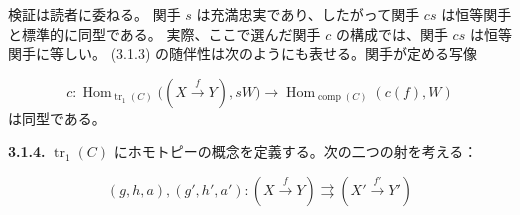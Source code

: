 検証は読者に委ねる。
関手 $s$ は充満忠実であり、したがって関手 $cs$ は恒等関手と標準的に同型である。
実際、ここで選んだ関手 $c$ の構成では、関手 $cs$ は恒等関手に等しい。
(3.1.3) の随伴性は次のようにも表せる。関手が定める写像

\begin{equation*}
  c\colon
  \operatorname{Hom}_{\operatorname{tr}_1(C)}
    \bigl((X\xrightarrow{f}Y),sW\bigr)
  \longrightarrow
  \operatorname{Hom}_{\operatorname{comp}(C)}(c(f),W)
\end{equation*}
は同型である。

\noindent\textbf{3.1.4.}\quad
$\operatorname{tr}_1(C)$ にホモトピーの概念を定義する。次の二つの射を考える：

\begin{equation*}
  (g,h,a),(g',h',a')\colon
  (X\xrightarrow{f}Y)
  \rightrightarrows
  (X'\xrightarrow{f'}Y')
\end{equation*}
